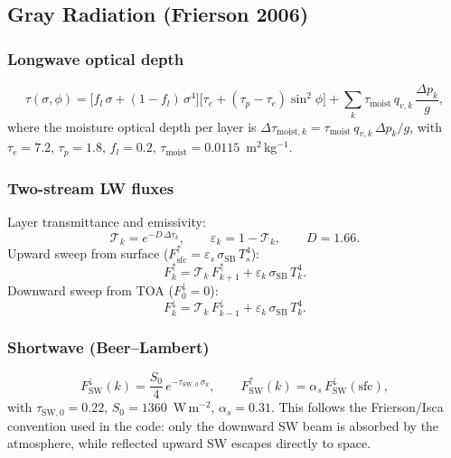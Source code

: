 \documentclass[11pt,a4paper]{article}
\newcommand{\SB}{\sigma_{\mathrm{SB}}}
\begin{document}
\subsection{Gray Radiation (Frierson 2006)}

\subsubsection{Longwave optical depth}
\begin{equation}
  \tau(\sigma,\phi) = \bigl[f_l\,\sigma+(1-f_l)\,\sigma^4\bigr]\bigl[\tau_e+(\tau_p-\tau_e)\sin^2\!\phi\bigr]
  + \sum_k \tau_{\mathrm{moist}}\,q_{v,k}\,\frac{\Delta p_k}{g},
\end{equation}
where the moisture optical depth per layer is
$\Delta\tau_{\mathrm{moist},k}=\tau_{\mathrm{moist}}\,q_{v,k}\,\Delta p_k/g$,
with $\tau_e=7.2$, $\tau_p=1.8$, $f_l=0.2$,
$\tau_{\mathrm{moist}}=0.0115$~m$^2$\,kg$^{-1}$.

\subsubsection{Two-stream LW fluxes}
Layer transmittance and emissivity:
\begin{equation}
  \mathcal T_k = e^{-D\,\Delta\tau_k}, \qquad \varepsilon_k = 1-\mathcal T_k, \qquad D=1.66.
\end{equation}
Upward sweep from surface ($F^\uparrow_{\mathrm{sfc}}=\varepsilon_s\,\SB\,T_s^4$):
\begin{equation}
  F^\uparrow_k = \mathcal T_k\,F^\uparrow_{k+1} + \varepsilon_k\,\SB\,T_k^4.
\end{equation}
Downward sweep from TOA ($F^\downarrow_0=0$):
\begin{equation}
  F^\downarrow_k = \mathcal T_k\,F^\downarrow_{k-1} + \varepsilon_k\,\SB\,T_k^4.
\end{equation}

\subsubsection{Shortwave (Beer--Lambert)}
\begin{equation}
  F^\downarrow_{\mathrm{SW}}(k) = \frac{S_0}{4}\,e^{-\tau_{\mathrm{SW},0}\,\sigma_k}, \qquad
  F^\uparrow_{\mathrm{SW}}(k) = \alpha_s\,F^\downarrow_{\mathrm{SW}}(\mathrm{sfc}),
\end{equation}
with $\tau_{\mathrm{SW},0}=0.22$, $S_0=1360$~W\,m$^{-2}$, $\alpha_s=0.31$.
This follows the Frierson/Isca convention used in the code: only the
downward SW beam is absorbed by the atmosphere, while reflected upward
SW escapes directly to space.
\end{document}
